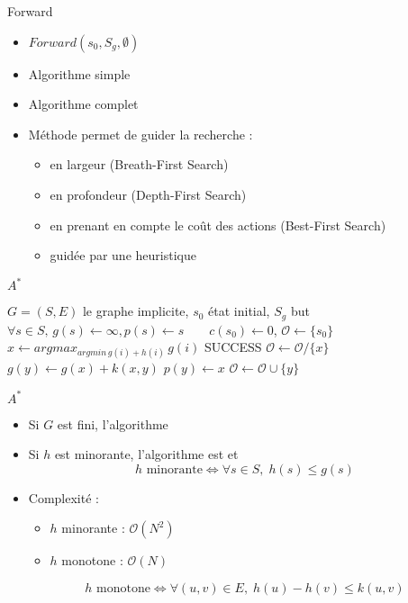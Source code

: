 \documentclass[compress]{beamer}
\begin{document}
\begin{frame}{Forward}
\begin{itemize}
\item $Forward(s_0, S_g, \emptyset)$
\item Algorithme simple
\item Algorithme complet
\item Méthode  permet de guider la recherche :
	\begin{itemize}
	\item en largeur (Breath-First Search)
	\item en profondeur (Depth-First Search)
	\item en prenant en compte le coût des actions (Best-First Search)
	\item guidée par une heuristique
	\end{itemize}
\end{itemize}
\end{frame}

\begin{frame}{$A^*$}
\begin{algorithmic}
\REQUIRE $G=(S,E)$ le graphe implicite, $s_0$ état initial, $S_g$ but
\STATE $\forall s \in S, \, g(s) \leftarrow \infty, p(s) \leftarrow s \qquad
	c(s_0) \leftarrow 0$, $\mathcal{O} \leftarrow \{s_0\}$
	\STATE $x \leftarrow argmax_{argmin \, g(i) + h(i)} \, g(i)$
    	\RETURN SUCCESS
    \ENDIF
	\STATE $\mathcal{O} \leftarrow \mathcal{O} / \{x\}$
			\STATE $g(y) \leftarrow g(x) + k(x,y)$
			\STATE $p(y) \leftarrow x$
			\STATE $\mathcal{O} \leftarrow \mathcal{O} \cup \{y\}$
		\ENDIF
	\ENDFOR
\ENDWHILE
\end{algorithmic}
\end{frame}

\begin{frame}{$A^*$}
\begin{itemize}
\item Si $G$ est fini, l'algorithme 
\item Si $h$ est minorante, l'algorithme est  et 
$$h \mbox{ minorante} \Leftrightarrow \forall s \in S, \; h(s) \leq g(s)$$
\item Complexité :
	\begin{itemize}
	\item $h$ minorante : $\mathcal{O}(N^2)$
	\item $h$ monotone : $\mathcal{O}(N)$
	\end{itemize}
$$h \mbox{ monotone} \Leftrightarrow \forall (u, v) \in E, \; h(u) - h(v) \leq k(u,v)$$
\end{itemize}
\end{frame}
\end{document}
